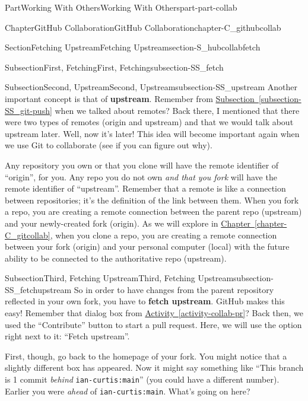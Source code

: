 \documentclass[oneside,10pt,]{book}
\newcommand{\xreffont}{\relax}
\newcommand{\mono}[1]{\texttt{#1}}
\newcommand{\terminology}[1]{\textbf{#1}}
\begin{document}
\begin{partptx}{Part}{Working With Others}{}{Working With Others}{}{}{part-part-collab}
\begin{chapterptx}{Chapter}{GitHub Collaboration}{}{GitHub Collaboration}{}{}{chapter-C_githubcollab}
\begin{sectionptx}{Section}{Fetching Upstream}{}{Fetching Upstream}{}{}{section-S_hubcollabfetch}
\begin{subsectionptx}{Subsection}{First, Fetching}{}{First, Fetching}{}{}{subsection-SS_fetch}
\end{subsectionptx}
%
%
\typeout{************************************************}
\typeout{************************************************}
%
\begin{subsectionptx}{Subsection}{Second, Upstream}{}{Second, Upstream}{}{}{subsection-SS_upstream}
%
%
Another important concept is that of \terminology{upstream}. Remember from \hyperref[subsection-SS_git-push]{Subsection~{\xreffont\ref{subsection-SS_git-push}}} when we talked about remotes? Back there, I mentioned that there were two types of remotes (origin and upstream) and that we would talk about upstream later. Well, now it's later! This idea will become important again when we use Git to collaborate (see if you can figure out why).%
\par
Any repository you own or that you clone will have the remote identifier of ``origin'', for you. Any repo you do not own \emph{and that you fork} will have the remote identifier of ``upstream''. Remember that a remote is like a connection between repositories; it's the definition of the link between them. When you fork a repo, you are creating a remote connection between the parent repo (upstream) and your newly-created fork (origin). As we will explore in \hyperref[chapter-C_gitcollab]{Chapter~{\xreffont\ref{chapter-C_gitcollab}}}, when you clone a repo, you are creating a remote connection between your fork (origin) and your personal computer (local) with the future ability to be connected to the authoritative repo (upstream).%
\end{subsectionptx}
%
%
\typeout{************************************************}
\typeout{************************************************}
%
\begin{subsectionptx}{Subsection}{Third, Fetching Upstream}{}{Third, Fetching Upstream}{}{}{subsection-SS_fetchupstream}
%
%
So in order to have changes from the parent repository reflected in your own fork, you have to \terminology{fetch upstream}. GitHub makes this easy! Remember that dialog box from \hyperref[activity-collab-pr]{Activity~{\xreffont\ref{activity-collab-pr}}}? Back then, we used the ``Contribute'' button to start a pull request. Here, we will use the option right next to it: ``Fetch upstream''.%
\par
First, though, go back to the homepage of your fork. You might notice that a slightly different box has appeared. Now it might say something like ``This branch is 1 commit \emph{behind} \mono{ian-curtis:main}'' (you could have a different number). Earlier you were \emph{ahead} of \mono{ian-curtis:main}. What's going on here?%

\end{subsectionptx}
\end{sectionptx}
\end{chapterptx}
\end{partptx}
\end{document}
